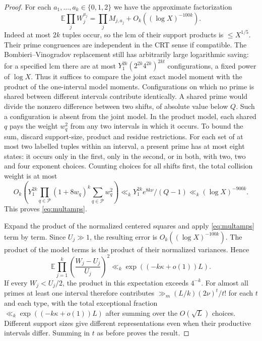 \documentclass[a4paper,11pt]{article}
\begin{document}
\begin{proof}
For each $a_1,\ldots,a_k\in\{0,1,2\}$ we have the approximate
factorization
\begin{equation}\label{eq:multamps}
 \mathbb E\prod_j W_j^{a_j}
  =\prod_j M_{j,a_j}+O_k((\log X)^{-100k}).
\end{equation}
Indeed at most $2k$ tuples occur, so the lcm of their support products
is $\le X^{1/5}$. Their prime congruences are independent in the
CRT sense if compatible. The Bombieri--Vinogradov replacement still
has arbitrarily large logarithmic saving: for a specified lcm there
are at most $Y_1^{2k}(2^{2k}4^{2k})^{2kt}$ configurations, a fixed
power of $\log X$. Thus it suffices to compare the joint exact model
moment with the product of the one-interval model moments.
Configurations on which no prime is shared between different
intervals contribute identically. A shared prime would divide the
nonzero difference between two shifts, of absolute value below
$Q$. Such a configuration is absent from the joint model. In the
product model, each shared $q$ pays the weight $w_q^2$ from any
two intervals in which it occurs. To bound the sum, discard support-size,
product and residue restrictions. For each set of at most two labelled
tuples within an interval, a present prime has at most eight states:
it occurs only in the first, only in the second, or in both, with
two, two and four exponent choices. Counting choices for all shifts
first, the total collision weight is at most
\[
 O_k\!\left(Y_1^{2k}
    \prod_{q\in\mathcal P}(1+8w_q)^k
    \sum_{q\in\mathcal P}w_q^2\right)
 \ll_k Y_1^{2k}e^{8k\nu}/(Q-1)
 \ll_k(\log X)^{-900k}.
\]
This proves \eqref{eq:multamps}.

Expand the product of the normalized centered squares and apply
\eqref{eq:multamps} term by term. Since $U_j\gg1$, the resulting
error is $O_k((\log X)^{-100k})$. The product of the model terms
is the product of their normalized variances. Hence
\[
 \mathbb E\prod_{j=1}^k\left(\frac{W_j-U_j}{U_j}\right)^2
 \ll_k \exp((-k\kappa+o(1))L).
\]
If every $W_j<U_j/2$, the product in this expectation exceeds
$4^{-k}$. For almost all primes at least one interval therefore
contributes $\gg_m (L/k)(2\nu)^t/t!$ for each $t$ and each type,
with the total exceptional fraction $\ll_k
\exp((-k\kappa+o(1))L)$ after summing over the $O(\sqrt L)$ choices.
Different support sizes give different representations even when their
productive intervals differ. Summing in $t$ as before proves the result.
\end{proof}
\end{document}
